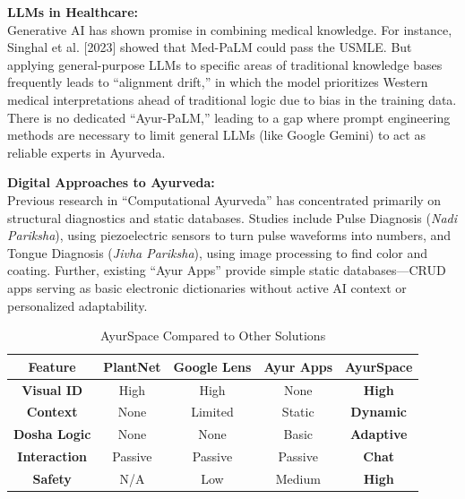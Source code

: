 \vspace{5mm}

\item \textbf{LLMs in Healthcare:}\\
Generative AI has shown promise in combining medical knowledge. For instance, Singhal et al. [2023] showed that Med-PaLM could pass the USMLE. But applying general-purpose LLMs to specific areas of traditional knowledge bases frequently leads to ``alignment drift,'' in which the model prioritizes Western medical interpretations ahead of traditional logic due to bias in the training data. There is no dedicated ``Ayur-PaLM,'' leading to a gap where prompt engineering methods are necessary to limit general LLMs (like Google Gemini) to act as reliable experts in Ayurveda.

\vspace{5mm}

\item \textbf{Digital Approaches to Ayurveda:}\\
Previous research in ``Computational Ayurveda'' has concentrated primarily on structural diagnostics and static databases. Studies include Pulse Diagnosis (\textit{Nadi Pariksha}), using piezoelectric sensors to turn pulse waveforms into numbers, and Tongue Diagnosis (\textit{Jivha Pariksha}), using image processing to find color and coating. Further, existing ``Ayur Apps'' provide simple static databases---CRUD apps serving as basic electronic dictionaries without active AI context or personalized adaptability.

\vspace{5mm}

\begin{table}[htbp]
\caption{AyurSpace Compared to Other Solutions}
\begin{center}
\begin{tabular}{|c|c|c|c|c|}
\hline
\textbf{Feature} & \textbf{PlantNet} & \textbf{Google Lens} & \textbf{Ayur Apps} & \textbf{AyurSpace} \\
\hline
\textbf{Visual ID} & High & High & None & \textbf{High} \\
\hline
\textbf{Context} & None & Limited & Static & \textbf{Dynamic} \\
\hline
\textbf{Dosha Logic} & None & None & Basic & \textbf{Adaptive} \\
\hline
\textbf{Interaction} & Passive & Passive & Passive & \textbf{Chat} \\
\hline
\textbf{Safety} & N/A & Low & Medium & \textbf{High} \\
\hline
\end{tabular}
\label{tab1}
\end{center}
\end{table}

